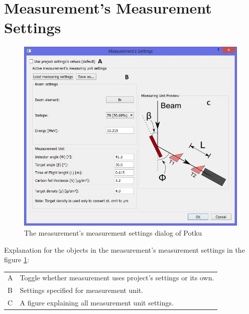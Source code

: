 \documentclass{scrreprt}
\begin{document}
\section{Measurement's Measurement Settings}\label{measurement-measurementsettings}
\begin{figure}[H]
\centering
\includegraphics[width=140mm]{measurement-measurementsettings}
\caption{The measurement's measurement settings dialog of Potku}
\label{fig-measurementsettings}
\end{figure}
Explanation for the objects in the measurement's measurement settings in the figure \ref{fig-measurementsettings}:

\begin{tabular}{ll}
A & Toggle whether measurement uses project's settings or its own.\\
B & Settings specified for measurement unit.\\
C & A figure explaining all measurement unit settings.\\
\end{tabular}

\end{document}
